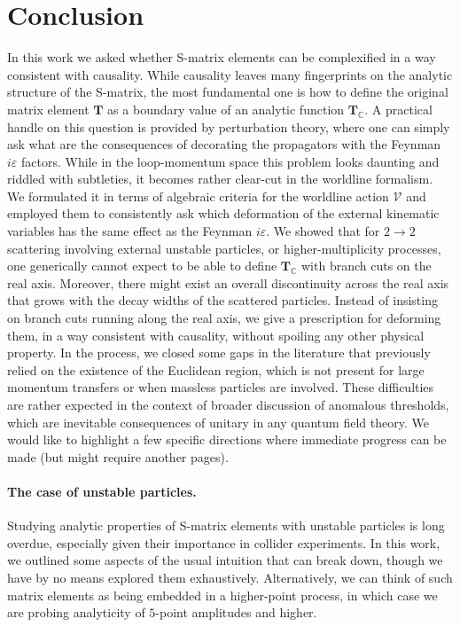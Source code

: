 \documentclass[12pt]{article}
\numberwithin{figure}{section}
\def \C {\mathbb{C}}
\def \eps {\varepsilon}
\def \V {\mathcal{V}}
\def \T {\mathbf{T}}
\begin{document}
				
\newpage
\section{Conclusion}

In this work we asked whether S-matrix elements can be complexified in a way consistent with causality. While causality leaves many fingerprints on the analytic structure of the S-matrix, the most fundamental one is how to define the original matrix element $\T$ as a boundary value of an analytic function $\T_\C$. A practical handle on this question is provided by perturbation theory, where one can simply ask what are the consequences of decorating the propagators with the Feynman $i\eps$ factors. While in the loop-momentum space this problem looks daunting and riddled with subtleties, it becomes rather clear-cut in the worldline formalism. We formulated it in terms of algebraic criteria for the worldline action $\V$ and employed them to consistently ask which deformation of the external kinematic variables has the same effect as the Feynman $i\eps$. We showed that for $2\to 2$ scattering involving external unstable particles, or higher-multiplicity processes, one generically cannot expect to be able to define $\T_\C$ with branch cuts on the real axis. Moreover, there might exist an overall discontinuity across the real axis that grows with the decay widths of the scattered particles. Instead of insisting on branch cuts running along the real axis, we give a prescription for deforming them, in a way consistent with causality, without spoiling any other physical property. In the process, we closed some gaps in the literature that previously relied on the existence of the Euclidean region, which is not present for large momentum transfers or when massless particles are involved. These difficulties are rather expected in the context of broader discussion of anomalous thresholds, which are inevitable consequences of unitary in any quantum field theory. We would like to highlight a few specific directions where immediate progress can be made (but might require another \pageref*{LastPage} pages).

\paragraph{The case of unstable particles.}
Studying analytic properties of S-matrix elements with unstable particles is long overdue, especially given their importance in collider experiments. In this work, we outlined some aspects of the usual intuition that can break down, though we have by no means explored them exhaustively. Alternatively, we can think of such matrix elements as being embedded in a higher-point process, in which case we are probing analyticity of $5$-point amplitudes and higher.
\end{document}
